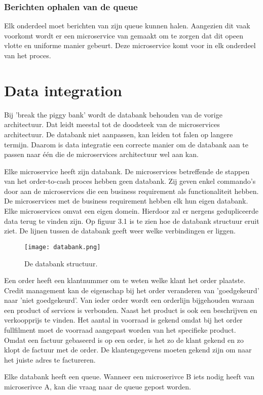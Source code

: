 \subsubsection{Berichten ophalen van de queue} 
Elk onderdeel moet berichten van zijn queue kunnen halen. Aangezien dit vaak voorkomt wordt er een microservice van gemaakt om te zorgen dat dit opeen vlotte en uniforme manier gebeurt. 
Deze microservice komt voor in elk onderdeel van het proces.

\section{Data integration}
Bij 'break the piggy bank' wordt de databank behouden van de vorige architectuur. Dat leidt meestal tot de doodsteek van de microservices architectuur. De databank niet aanpassen, kan leiden tot falen op langere termijn. Daarom is data integratie een correcte manier om de databank aan te passen naar één die de microservices architectuur wel aan kan.

Elke microservice heeft zijn databank. De microservices betreffende de stappen van het order-to-cash proces hebben geen databank. Zij geven enkel commando's door aan de microservices die een business requirement als functionaliteit hebben. De microservices met de business requirement hebben elk hun eigen databank. Elke microservices omvat een eigen domein. Hierdoor zal er nergens gedupliceerde data terug te vinden zijn. Op figuur 3.1 is te zien hoe de databank structuur eruit ziet. De lijnen tussen de databank geeft weer welke verbindingen er liggen. 
\begin{figure}[h!]
	\texttt{[image: databank.png]}
	\caption{De databank structuur.}
	\centering
\end{figure}

Een order heeft een klantnummer om te weten welke klant het order plaatste. Credit management kan de eigenschap bij het order veranderen van 'goedgekeurd' naar 'niet goedgekeurd'. Van ieder order wordt een orderlijn bijgehouden waraan een product of services is verbonden. Naast het product is ook een beschrijven en verkoopprijs te vinden. Het aantal in voorraad is gekend omdat bij het order fullfilment moet de voorraad aangepast worden van het specifieke product. Omdat een factuur gebaseerd is op een order, is het zo de klant gekend en zo klopt de factuur met de order. De klantengegevens moeten gekend zijn om naar het juiste adres te factureren.

Elke databank heeft een queue. Wanneer een microserivce B iets nodig heeft van microserivce A, kan die vraag naar de queue gepost worden.

